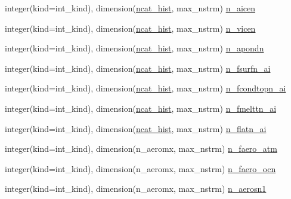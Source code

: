 \begin{DoxyCompactItemize}
\item 
integer(kind=int\_\-kind), dimension(\hyperlink{namespaceice__history__fields_ad4675933f882f223e8ec25c5c938b13e}{ncat\_\-hist}, max\_\-nstrm) \hyperlink{namespaceice__history__fields_a31b00fc2e404e255f40cfa9144865c6f}{n\_\-aicen}
\item 
integer(kind=int\_\-kind), dimension(\hyperlink{namespaceice__history__fields_ad4675933f882f223e8ec25c5c938b13e}{ncat\_\-hist}, max\_\-nstrm) \hyperlink{namespaceice__history__fields_afd312fa27e4e7c7979312795eaed3435}{n\_\-vicen}
\item 
integer(kind=int\_\-kind), dimension(\hyperlink{namespaceice__history__fields_ad4675933f882f223e8ec25c5c938b13e}{ncat\_\-hist}, max\_\-nstrm) \hyperlink{namespaceice__history__fields_a4d3b9e888569b2534dbceeaf3292b696}{n\_\-apondn}
\item 
integer(kind=int\_\-kind), dimension(\hyperlink{namespaceice__history__fields_ad4675933f882f223e8ec25c5c938b13e}{ncat\_\-hist}, max\_\-nstrm) \hyperlink{namespaceice__history__fields_a547e15c8d6d1890d8acb698c12ca6583}{n\_\-fsurfn\_\-ai}
\item 
integer(kind=int\_\-kind), dimension(\hyperlink{namespaceice__history__fields_ad4675933f882f223e8ec25c5c938b13e}{ncat\_\-hist}, max\_\-nstrm) \hyperlink{namespaceice__history__fields_a277bf94595092110d32c0719616159fc}{n\_\-fcondtopn\_\-ai}
\item 
integer(kind=int\_\-kind), dimension(\hyperlink{namespaceice__history__fields_ad4675933f882f223e8ec25c5c938b13e}{ncat\_\-hist}, max\_\-nstrm) \hyperlink{namespaceice__history__fields_a950d3a5fcd1b660e07bdea0c7d67cecb}{n\_\-fmelttn\_\-ai}
\item 
integer(kind=int\_\-kind), dimension(\hyperlink{namespaceice__history__fields_ad4675933f882f223e8ec25c5c938b13e}{ncat\_\-hist}, max\_\-nstrm) \hyperlink{namespaceice__history__fields_aeea32af91b4549502cf55fa0b93f1778}{n\_\-flatn\_\-ai}
\item 
integer(kind=int\_\-kind), dimension(n\_\-aeromx, max\_\-nstrm) \hyperlink{namespaceice__history__fields_ac09149d16d9045cc266eff8a26ff0d97}{n\_\-faero\_\-atm}
\item 
integer(kind=int\_\-kind), dimension(n\_\-aeromx, max\_\-nstrm) \hyperlink{namespaceice__history__fields_ae402016c2d3706af277fb399ec8f5ec6}{n\_\-faero\_\-ocn}
\item 
integer(kind=int\_\-kind), dimension(n\_\-aeromx, max\_\-nstrm) \hyperlink{namespaceice__history__fields_afb0db2f3c0c14963f02057fbc84887bc}{n\_\-aerosn1}
\item 

\end{DoxyCompactItemize}
